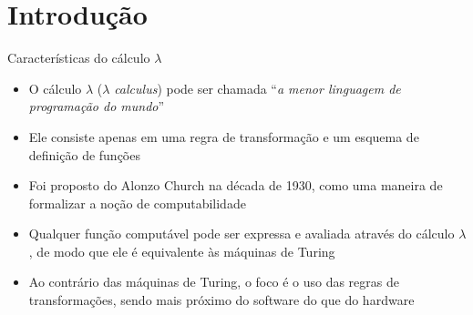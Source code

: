 \section{Introdução}

\begin{frame}[fragile]{Características do cálculo $\lambda$}

    \begin{itemize}
        \item O cálculo $\lambda$ ($\lambda$ \textit{calculus}) pode ser chamada ``\textit{a menor 
            linguagem de programação do mundo}''

        \item Ele consiste apenas em uma regra de transformação e um esquema de definição de 
            funções

        \item Foi proposto do Alonzo Church na década de 1930, como uma maneira de formalizar a
            noção de computabilidade

        \item Qualquer função computável pode ser expressa e avaliada através do cálculo $\lambda$,
            de modo que ele é equivalente às máquinas de Turing
            
        \item Ao contrário das máquinas de Turing, o foco é o uso das regras de transformações, 
            sendo mais próximo do software do que do hardware
    \end{itemize}

\end{frame}
